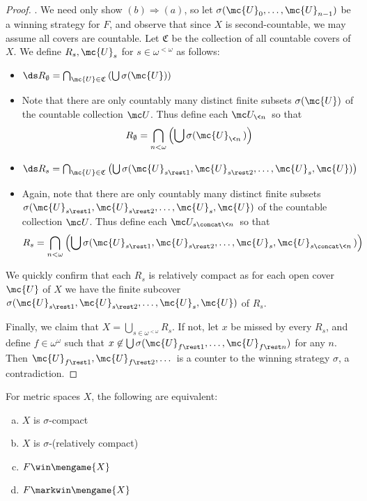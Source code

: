   \begin{proof}.
    We need only show $(b)\Rightarrow(a)$, so let $\sigma(\mc{U}_0,\dots,\mc{U}_{n-1})$ be a winning strategy for $F$, and observe that since $X$ is second-countable, we may assume all covers are countable. Let $\mathfrak{C}$ be the collection of all countable covers of $X$. We define $R_s,\mc{U}_s$ for $s\in\omega^{<\omega}$ as follows:
      \begin{itemize}
        \item $\ds R_\emptyset = \bigcap_{\mc{U}\in\mathfrak{C}} \left(\bigcup \sigma(\mc{U})\right)$
        \item Note that there are only countably many distinct finite subsets $\sigma(\mc{U})$ of the countable collection $\mc U$. Thus define each $\mc U_{\<n\>}$ so that
          \[
            R_\emptyset = 
            \bigcap_{n<\omega}\left(\bigcup\sigma(\mc{U}_{\<n\>})\right)
          \]
        \item $\ds R_s = \bigcap_{\mc{U}\in\mathfrak{C}} \left(\bigcup \sigma(\mc{U}_{s\rest1},\mc{U}_{s\rest2},\dots,\mc{U}_s,\mc{U})\right)$
        \item Again, note that there are only countably many distinct finite subsets $\sigma(\mc{U}_{s\rest1},\mc{U}_{s\rest2},\dots,\mc{U}_s,\mc{U})$ of the countable collection $\mc U$. Thus define each $\mc U_{s\concat\<n\>}$ so that 
          \[
            R_s = 
            \bigcap_{n<\omega} \left(\bigcup \sigma(\mc{U}_{s\rest1},\mc{U}_{s\rest2},\dots,\mc{U}_s,\mc{U}_{s\concat\<n\>})\right)
          \]
      \end{itemize}

    We quickly confirm that each $R_s$ is relatively compact as for each open cover $\mc{U}$ of $X$ we have the finite subcover $\sigma(\mc{U}_{s\rest1},\mc{U}_{s\rest2},\dots,\mc{U}_s,\mc{U})$ of $R_s$.

    Finally, we claim that $X = \bigcup_{s\in\omega^{<\omega}} R_s$. If not, let $x$ be missed by every $R_s$, and define $f\in\omega^\omega$ such that $x\not\in \bigcup\sigma(\mc{U}_{f\rest1},\dots,\mc{U}_{f\rest n})$ for any $n$. Then $\mc{U}_{f\rest1},\mc{U}_{f\rest2},\dots$ is a counter to the winning strategy $\sigma$, a contradiction.
  \end{proof}

  \begin{cor}
    For metric spaces $X$, the following are equivalent:
      \begin{enumerate}[(a)]
        \item $X$ is $\sigma$-compact
        \item $X$ is $\sigma$-(relatively compact)
        \item $F \win \mengame{X}$
        \item $F \markwin \mengame{X}$
      \end{enumerate}
  \end{cor}

